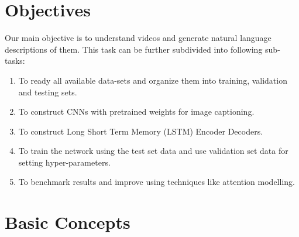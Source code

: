 \documentclass{article}
\begin{document}
	\section{Objectives}
		Our main objective is to understand videos and generate natural language descriptions of them. This task can be further subdivided into following sub-tasks:
		\begin{enumerate}
			\item
				To ready all available data-sets and organize them into training, validation and testing sets.
			\item
				To construct CNNs with pretrained weights for image captioning.
			\item
				To construct Long Short Term Memory (LSTM) Encoder Decoders.
			\item
				To train the network using the test set data and use validation set data for setting hyper-parameters.
			\item
				To benchmark results and improve using techniques like attention modelling.
		\end{enumerate}		 


\section{Basic Concepts} 
\end{document}
